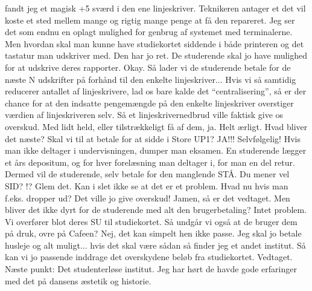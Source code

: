 \documentclass[a4paper,11pt]{article}
\begin{document}
\begin{sketch}
           fandt jeg et magisk +5 sværd i den ene linjeskriver. Teknikeren
           antager et det vil koste et sted mellem mange og rigtig
           mange penge at få den repareret.
 Jeg ser det som endnu en oplagt mulighed for genbrug af
           systemet med terminalerne.
   Men hvordan skal man kunne have studiekortet siddende i
           både printeren og det tastatur man udskriver med.
  Den har jo ret. De studerende skal jo have mulighed for at
           udskrive deres rapporter.
 Okay. Så lader vi de studerende betale for de næste N
           udskrifter på forhånd til den enkelte linjeskriver...
  Hvis vi så samtidig reducerer antallet af linjeskrivere, lad os
           bare kalde det ``centralisering'', så er der chance for at
           den indsatte pengemængde på den enkelte linjeskriver overstiger
           værdien af linjeskriveren selv.
 Så et linjeskrivernedbrud ville faktisk give os overskud.
  Med lidt held, eller tilstrækkeligt få af dem, ja.
   Helt ærligt. Hvad bliver det næste? Skal vi til at betale
           for at sidde i Store UP1?
  JA!!!
 Selvfølgelig!
           Hvis man ikke deltager i undervisningen, dumper man
           eksamen. En studerende lægger et års depositum, og for hver
           forelæsning man deltager i, for man en del retur.
           Dermed vil de studerende, selv betale for den manglende STÅ.
   Du mener vel SID?
 !?
   Glem det. Kan i slet ikke se at det er et problem. Hvad nu
           hvis man f.eks. dropper ud?
  Det ville jo give
           overskud!
  Jamen, så er det vedtaget. 
   Men bliver det ikke dyrt for de studerende med alt den
           brugerbetaling?
 Intet problem. Vi overfører blot deres SU til studiekortet.
           Så undgår vi også at de bruger dem på druk, ovre på Cafeen?
   Nej, det kan simpelt hen ikke passe. Jeg skal jo betale
           husleje og alt muligt... hvis det skal være sådan så finder
           jeg et andet institut. 
 Så kan vi jo passende inddrage det overskydene beløb fra
           studiekortet.
  Vedtaget. Næste punkt: Det studenterløse
           institut. Jeg har hørt de havde gode erfaringer med det på
           dansens æstetik og historie.




\end{sketch}
\end{document}
